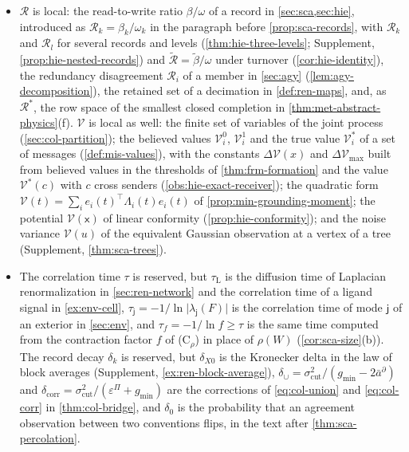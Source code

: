 \begin{itemize}
\item $\mathcal R$ is local: the read-to-write ratio $\beta/\omega$ of a record in \cref{sec:sca,sec:hie}, introduced as $\mathcal R_k=\beta_k/\omega_k$ in the paragraph before \cref{prop:sca-records}, with $\mathcal R_k$ and $\mathcal R_l$ for several records and levels (\cref{thm:hie-three-levels}; Supplement, \cref{prop:hie-nested-records}) and $\tilde{\mathcal R}=\tilde\beta/\omega$ under turnover (\cref{cor:hie-identity}), the redundancy disagreement $\mathcal R_i$ of a member in \cref{sec:agy} (\cref{lem:agy-decomposition}), the retained set of a decimation in \cref{def:ren-maps}, and, as $\mathcal R^\ast$, the row space of the smallest closed completion in \cref{thm:met-abstract-physics}(f). $\mathcal V$ is local as well: the finite set of variables of the joint process (\cref{sec:col-partition}); the believed values $\mathcal V^0_i$, $\mathcal V^1_i$ and the true value $\mathcal V^\ast_i$ of a set of messages (\cref{def:mis-values}), with the constants $\Delta\mathcal V(x)$ and $\Delta\mathcal V_{\max}$ built from believed values in the thresholds of \cref{thm:frm-formation} and the value $\mathcal V^\ast(c)$ with $c$ cross senders (\cref{obs:hie-exact-receiver}); the quadratic form $\mathcal V(t)=\sum_ie_i(t)^\top\Lambda_i(t)e_i(t)$ of \cref{prop:min-grounding-moment}; the potential $\mathcal V(\mathsf x)$ of linear conformity (\cref{prop:hie-conformity}); and the noise variance $\mathcal V(u)$ of the equivalent Gaussian observation at a vertex of a tree (Supplement, \cref{thm:sca-trees}).
\item The correlation time $\tau$ is reserved, but $\tau_{\mathrm L}$ is the diffusion time of Laplacian renormalization in \cref{sec:ren-network} and the correlation time of a ligand signal in \cref{ex:env-cell}, $\tau_{\mathsf j}=-1/\ln\lvert\lambda_{\mathsf j}(F)\rvert$ is the correlation time of mode $\mathsf j$ of an exterior in \cref{sec:env}, and $\tau_f=-1/\ln f\ge\tau$ is the same time computed from the contraction factor $f$ of \textup{(C$_\rho$)} in place of $\rho(W)$ (\cref{cor:sca-size}(b)). The record decay $\delta_k$ is reserved, but $\delta_{X0}$ is the Kronecker delta in the law of block averages (Supplement, \cref{ex:ren-block-average}), $\delta_\cup=\sigma^2_{\mathrm{cut}}/(g_{\min}-2\bar a^\partial)$ and $\delta_{\mathrm{corr}}=\sigma^2_{\mathrm{cut}}/(\varepsilon^\Pi+g_{\min})$ are the corrections of \eqref{eq:col-union} and \eqref{eq:col-corr} in \cref{thm:col-bridge}, and $\delta_0$ is the probability that an agreement observation between two conventions flips, in the text after \cref{thm:sca-percolation}.

\end{itemize}
